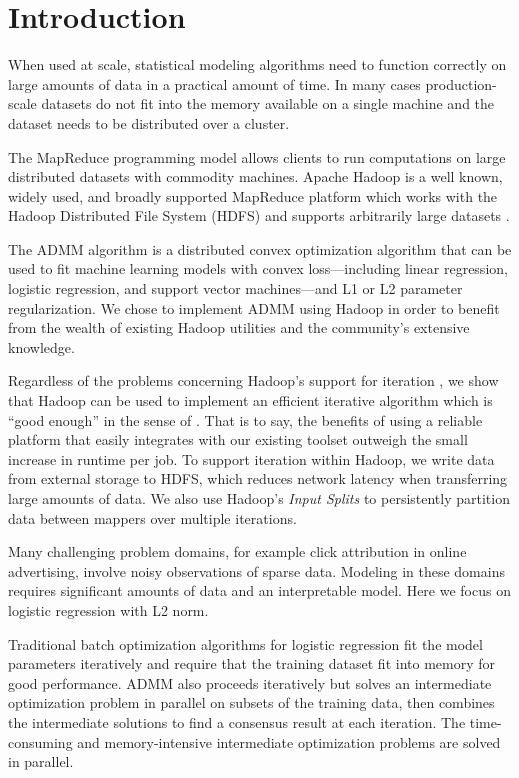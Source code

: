 \documentclass[10pt, conference, compsocconf]{IEEEtran}
\begin{document}
\section{Introduction}
When used at scale, statistical modeling algorithms need to function correctly on large amounts of data in a practical amount of time.  In many cases production-scale datasets do not fit into the memory available on a single machine and the dataset needs to be distributed over a cluster.

The MapReduce programming model \cite{dean2004} allows clients to run computations on large distributed datasets with commodity machines.  Apache Hadoop is a well known, widely used, and broadly supported MapReduce platform which works with the Hadoop Distributed File System (HDFS)  and supports arbitrarily large datasets \cite{white2009}.

The ADMM algorithm \cite{boyd} is a distributed convex optimization algorithm that can be used to fit machine learning models with convex loss---including linear regression, logistic regression, and support vector machines---and L1 or L2 parameter regularization.  We chose to implement ADMM using Hadoop in order to benefit from the wealth of existing Hadoop utilities and the community's extensive knowledge.

Regardless of the problems concerning Hadoop's support for iteration \cite{bu2010}, we show that Hadoop can be used to implement an efficient iterative algorithm which is ``good enough'' in the sense of \cite{lin2012}.  That is to say, the benefits of using a reliable platform that easily integrates with our existing toolset outweigh the small increase in runtime per job.  To support iteration within Hadoop, we write data from external storage to HDFS, which reduces network latency when transferring large amounts of data.  We also use Hadoop's \emph{Input Splits} to persistently partition data between mappers over multiple iterations.

Many challenging problem domains, for example click attribution in online advertising, involve noisy observations of sparse data.  Modeling in these domains requires significant amounts of data and an interpretable model.  Here we focus on logistic regression with L2 norm.

Traditional batch optimization algorithms for logistic regression fit the model parameters iteratively and require that the training dataset fit into memory for good performance. ADMM also proceeds iteratively but solves an intermediate optimization problem in parallel on subsets of the training data, then combines the intermediate solutions to find a consensus result at each iteration. The time-consuming and memory-intensive intermediate optimization problems are solved in parallel.
\end{document}
